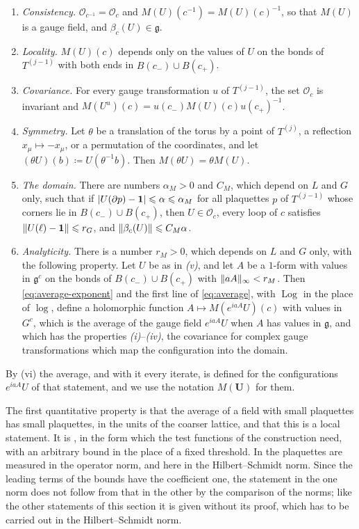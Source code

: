 \documentclass[11pt]{preprint}
\newcommand{\id}{\mathbf 1}
\DeclarePairedDelimiter{\abs}{\lvert}{\rvert}
\DeclarePairedDelimiter{\norm}{\lVert}{\rVert}
\numberwithin{equation}{section}
\begin{document}
\begin{lemma}\label{lem:average}
\begin{enumerate}[label=(\roman*)]
\item \emph{Consistency.} $\mathcal O_{c^{-1}} = \mathcal O_c$ and $M(U)(c^{-1}) = M(U)(c)^{-1}$, so that $M(U)$ is a gauge field, and $\beta_c(U) \in \mathfrak g$.
\item \emph{Locality.} $M(U)(c)$ depends only on the values of $U$ on the bonds of $T^{(j-1)}$ with both ends in $B(c_-) \cup B(c_+)$.
\item \emph{Covariance.} For every gauge transformation $u$ of $T^{(j-1)}$, the set $\mathcal O_c$ is invariant and $M(U^u)(c) = u(c_-)M(U)(c)u(c_+)^{-1}$.
\item \emph{Symmetry.} Let $\theta$ be a translation of the torus by a point of $T^{(j)}$, a reflection $x_\mu \mapsto -x_\mu$, or a permutation of the coordinates, and let $(\theta U)(b) \coloneqq U(\theta^{-1}b)$. Then $M(\theta U) = \theta M(U)$.
\item \emph{The domain.} There are numbers $\alpha_M > 0$ and $C_M$, which depend on $L$ and $G$ only, such that if $\abs{U(\partial p) - \id} \leqslant \alpha \leqslant \alpha_M$ for all plaquettes $p$ of $T^{(j-1)}$ whose corners lie in $B(c_-) \cup B(c_+)$, then $U \in \mathcal O_c$, every loop of $c$ satisfies $\norm{U(\ell) - \id} \leqslant r_G$, and $\norm{\beta_c(U)} \leqslant C_M\alpha$.
\item \emph{Analyticity.} There is a number $r_M > 0$, which depends on $L$ and $G$ only, with the following property. Let $U$ be as in \emph{(v)}, and let $A$ be a $1$-form with values in $\mathfrak g^c$ on the bonds of $B(c_-) \cup B(c_+)$ with $\norm{aA}_\infty < r_M$. Then \eqref{eq:average-exponent} and the first line of \eqref{eq:average}, with $\operatorname{Log}$ in the place of $\log$, define a holomorphic function $A \mapsto M(e^{iaA}U)(c)$ with values in $G^c$, which is the average of the gauge field $e^{iaA}U$ when $A$ has values in $\mathfrak g$, and which has the properties \emph{(i)}--\emph{(iv)}, the covariance for complex gauge transformations which map the configuration into the domain.
\end{enumerate}
\end{lemma}

By (vi) the average, and with it every iterate, is defined for the configurations $e^{iaA}U$ of that statement, and we use the notation $M(\mathbf U)$ for them.

The first quantitative property is that the average of a field with small plaquettes has small plaquettes, in the units of the coarser lattice, and that this is a local statement. It is \cite[Propositions~1, 2, pp.~26]{BalabanAVG}, in the form which the test functions of the construction need, with an arbitrary bound in the place of a fixed threshold. In \cite{BalabanAVG} the plaquettes are measured in the operator norm, and here in the Hilbert--Schmidt norm. Since the leading terms of the bounds have the coefficient one, the statement in the one norm does not follow from that in the other by the comparison of the norms; like the other statements of this section it is given without its proof, which has to be carried out in the Hilbert--Schmidt norm.
\end{document}
